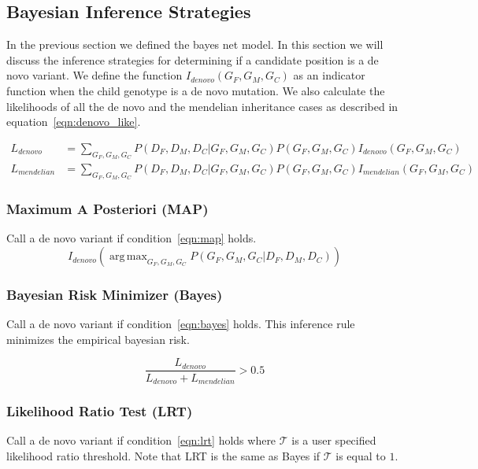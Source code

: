 \documentclass{article}
\DeclareMathOperator*{\argmax}{arg\,max}
\begin{document}
\subsection{Bayesian Inference Strategies}
In the previous section we defined the bayes net model. In this section we will discuss the inference strategies for determining if a candidate position is a de novo variant. We define the function $I_{denovo}(G_F,G_M,G_C)$ as an indicator function when the child genotype is a de novo mutation. We also calculate the likelihoods of all the de novo and the mendelian inheritance cases as described in equation~\ref{eqn:denovo_like}.

\begin{align}
\label{eqn:denovo_like}
L_{denovo} &= \sum_{G_F,G_M,G_C}P(D_F,D_M,D_C|G_F,G_M,G_C)P(G_F,G_M,G_C)I_{denovo}(G_F,G_M,G_C)\\
L_{mendelian} &= \sum_{G_F,G_M,G_C}P(D_F,D_M,D_C|G_F,G_M,G_C)P(G_F,G_M,G_C)I_{mendelian}(G_F,G_M,G_C)
\end{align}

\subsubsection{Maximum A Posteriori (MAP)}
Call a de novo variant if condition~\ref{eqn:map} holds.
\begin{equation}
\label{eqn:map}
I_{denovo}(\argmax_{G_F,G_M,G_C} P(G_F,G_M,G_C|D_F,D_M,D_C))
\end{equation}

\subsubsection{Bayesian Risk Minimizer (Bayes)}
Call a de novo variant if condition~\ref{eqn:bayes} holds. This inference rule minimizes the empirical bayesian risk.

\begin{equation}
\label{eqn:bayes}
\frac{L_{denovo}}{L_{denovo} + L_{mendelian}} > 0.5
\end{equation}

\subsubsection{Likelihood Ratio Test (LRT)}
Call a de novo variant if condition~\ref{eqn:lrt} holds where $\mathcal{T}$ is a user specified likelihood ratio threshold. Note that LRT is the same as Bayes if $\mathcal{T}$ is equal to $1$.
\end{document}

